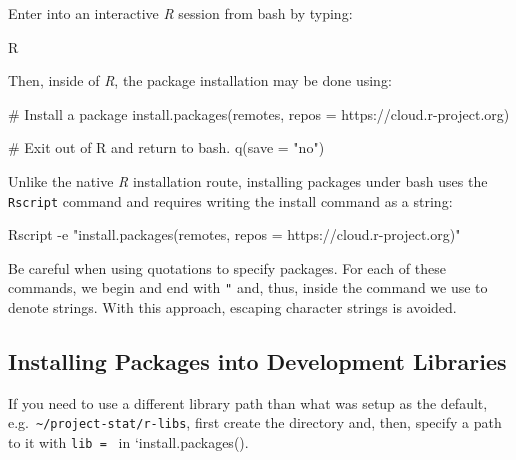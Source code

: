 \documentclass[
  letterpaper,
  DIV=11,
  numbers=noendperiod]{scrreport}
\newenvironment{Shaded}{\begin{snugshade}}{\end{snugshade}}
\newcommand{\AttributeTok}[1]{\textcolor[rgb]{0.40,0.45,0.13}{#1}}
\newcommand{\CommentTok}[1]{\textcolor[rgb]{0.37,0.37,0.37}{#1}}
\newcommand{\ExtensionTok}[1]{\textcolor[rgb]{0.00,0.23,0.31}{#1}}
\newcommand{\FunctionTok}[1]{\textcolor[rgb]{0.28,0.35,0.67}{#1}}
\newcommand{\NormalTok}[1]{\textcolor[rgb]{0.00,0.23,0.31}{#1}}
\newcommand{\StringTok}[1]{\textcolor[rgb]{0.13,0.47,0.30}{#1}}
\begin{document}
Enter into an interactive \emph{R} session from bash by typing:

\begin{Shaded}
\begin{Highlighting}[]
\ExtensionTok{R}
\end{Highlighting}
\end{Shaded}

Then, inside of \emph{R}, the package installation may be done using:

\begin{Shaded}
\begin{Highlighting}[]
\CommentTok{\# Install a package}
\FunctionTok{install.packages}\NormalTok{(}\StringTok{\textquotesingle{}remotes\textquotesingle{}}\NormalTok{, }\AttributeTok{repos =} \StringTok{\textquotesingle{}https://cloud.r{-}project.org\textquotesingle{}}\NormalTok{)}

\CommentTok{\# Exit out of R and return to bash.}
\FunctionTok{q}\NormalTok{(}\AttributeTok{save =} \StringTok{"no"}\NormalTok{)}
\end{Highlighting}
\end{Shaded}

Unlike the native \emph{R} installation route, installing packages under
bash uses the \texttt{Rscript} command and requires writing the install
command as a string:

\begin{Shaded}
\begin{Highlighting}[]
\ExtensionTok{Rscript} \AttributeTok{{-}e} \StringTok{"install.packages(\textquotesingle{}remotes\textquotesingle{}, repos = \textquotesingle{}https://cloud.r{-}project.org\textquotesingle{})"}
\end{Highlighting}
\end{Shaded}

Be careful when using quotations to specify packages. For each of these
commands, we begin and end with \texttt{"} and, thus, inside the command
we use \texttt{\textquotesingle{}} to denote strings. With this
approach, escaping character strings is avoided.

\hypertarget{installing-packages-into-development-libraries}{%
\subsection{Installing Packages into Development
Libraries}\label{installing-packages-into-development-libraries}}

If you need to use a different library path than what was setup as the
default, e.g.~\texttt{\textasciitilde{}/project-stat/r-libs}, first
create the directory and, then, specify a path to it with
\texttt{lib\ =\ \textquotesingle{}\textquotesingle{}} in
`install.packages().
\end{document}
